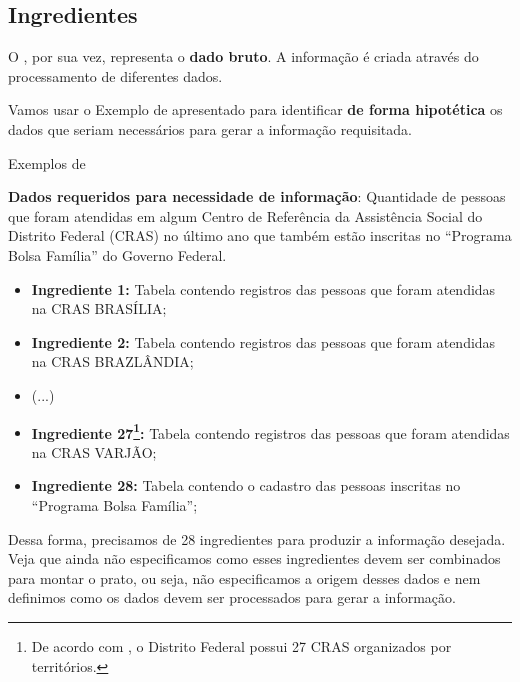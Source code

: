 \subsection*{Ingredientes}
\label{sub-ingredientes}

    O \INGREDIENTE, por sua vez, representa o \textbf{dado bruto}. A informação é criada através do processamento de diferentes dados. 
    
    Vamos usar o Exemplo de \PRATO \xspace apresentado para identificar \textbf{de forma hipotética} os dados que seriam necessários para gerar a informação requisitada.

    \begin{env-exemplo}{Exemplos de \INGREDIENTES}
    
        \textbf{Dados requeridos para necessidade de informação}: Quantidade de pessoas que foram atendidas em algum Centro de Referência da Assistência Social do Distrito Federal (CRAS) no último ano que também estão inscritas no ``Programa Bolsa Família'' do Governo Federal.
    
        \begin{itemize}
            \item \textbf{Ingrediente 1:} 
            Tabela contendo registros das pessoas que foram atendidas na CRAS BRASÍLIA;
            
            \item \textbf{Ingrediente 2:} 
            Tabela contendo registros das pessoas que foram atendidas na CRAS BRAZLÂNDIA;
            
            \item (...)
            
            \item \textbf{Ingrediente 27\footnote{De acordo com \cite{intro:cras}, o Distrito Federal possui 27 CRAS organizados por territórios.}:} Tabela contendo registros das pessoas que foram atendidas na CRAS VARJÃO;

            \item \nohyphens{\textbf{Ingrediente 28:} Tabela contendo o cadastro das pessoas inscritas no ``Programa Bolsa Família'';}
        \end{itemize}
    \end{env-exemplo}    
    
    Dessa forma, precisamos de 28 ingredientes para produzir a informação desejada. Veja que ainda não especificamos como esses ingredientes devem ser combinados para montar o prato, ou seja, não especificamos a origem desses dados e nem definimos como os dados devem ser processados para gerar a informação.
    
